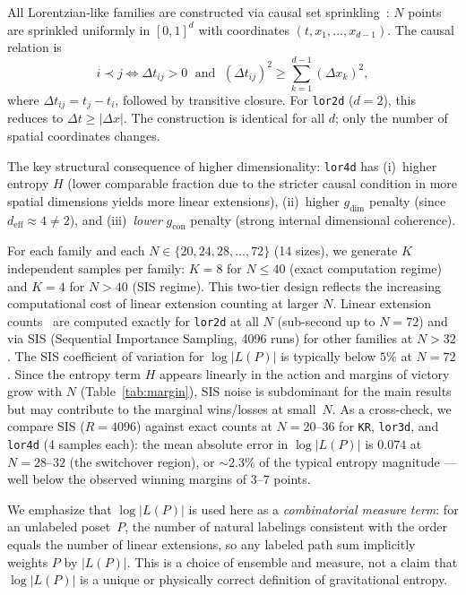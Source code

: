\documentclass[11pt,a4paper]{article}
\begin{document}
All Lorentzian-like families are constructed via causal set sprinkling~\cite{bombelli1987}: $N$ points are sprinkled uniformly in $[0,1]^d$ with coordinates $(t, x_1, \ldots, x_{d-1})$. The causal relation is
\begin{equation}
    i \prec j \iff \Delta t_{ij} > 0 \;\text{ and }\; (\Delta t_{ij})^2 \geq \sum_{k=1}^{d-1} (\Delta x_k)^2,
    \label{eq:causal}
\end{equation}
where $\Delta t_{ij} = t_j - t_i$, followed by transitive closure. For \texttt{lor2d} ($d = 2$), this reduces to $\Delta t \geq |\Delta x|$. The construction is identical for all $d$; only the number of spatial coordinates changes.

The key structural consequence of higher dimensionality: \texttt{lor4d} has (i)~higher entropy $H$ (lower comparable fraction due to the stricter causal condition in more spatial dimensions yields more linear extensions), (ii)~higher $g_{\text{dim}}$ penalty (since $d_{\text{eff}} \approx 4 \neq 2$), and (iii)~\emph{lower} $g_{\text{con}}$ penalty (strong internal dimensional coherence).

For each family and each $N \in \{20, 24, 28, \ldots, 72\}$ (14 sizes), we generate $K$ independent samples per family: $K = 8$ for $N \leq 40$ (exact computation regime) and $K = 4$ for $N > 40$ (SIS regime). This two-tier design reflects the increasing computational cost of linear extension counting at larger $N$. Linear extension counts~\cite{brightwell1991} are computed exactly for \texttt{lor2d} at all $N$ (sub-second up to $N = 72$) and via SIS (Sequential Importance Sampling, 4096 runs) for other families at $N > 32$. The SIS coefficient of variation for $\log|L(P)|$ is typically below $5\%$ at $N = 72$. Since the entropy term $H$ appears linearly in the action and margins of victory grow with $N$ (Table~\ref{tab:margin}), SIS noise is subdominant for the main results but may contribute to the marginal wins/losses at small~$N$. As a cross-check, we compare SIS ($R = 4096$) against exact counts at $N = 20$--$36$ for \texttt{KR}, \texttt{lor3d}, and \texttt{lor4d} (4 samples each): the mean absolute error in $\log|L(P)|$ is $0.074$ at $N = 28$--$32$ (the switchover region), or $\sim 2.3\%$ of the typical entropy magnitude --- well below the observed winning margins of $3$--$7$ points.

We emphasize that $\log|L(P)|$ is used here as a \emph{combinatorial measure term}: for an unlabeled poset~$P$, the number of natural labelings consistent with the order equals the number of linear extensions, so any labeled path sum implicitly weights $P$ by $|L(P)|$. This is a choice of ensemble and measure, not a claim that $\log|L(P)|$ is a unique or physically correct definition of gravitational entropy.
\end{document}
